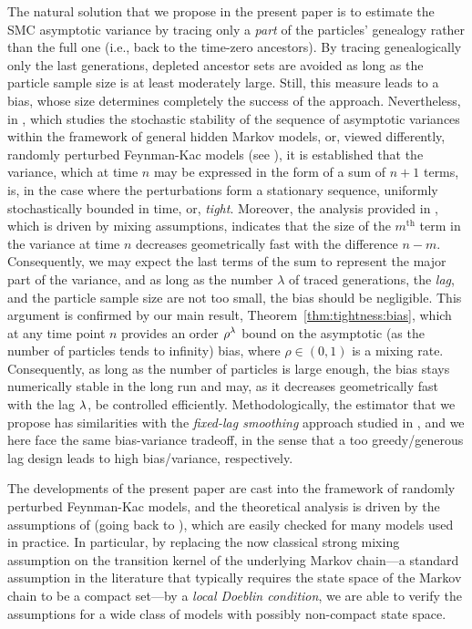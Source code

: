 The natural solution that we propose in the present paper is to estimate the SMC asymptotic variance by tracing only a \emph{part} of the particles' genealogy rather than the full one (i.e., back to the time-zero ancestors). By tracing genealogically only the last generations, depleted ancestor sets are avoided as long as the particle sample size is at least moderately large. Still, this measure leads to a bias, whose size determines completely the success of the approach. Nevertheless, in \cite{douc:moulines:olsson:2014}, which studies the stochastic stability of the sequence of asymptotic variances within the framework of general hidden Markov models, or, viewed differently, randomly perturbed Feynman-Kac models (see \cite[Remark~1]{douc:moulines:olsson:2014}), it is established that the variance, which at time $n$ may be expressed in the form of a sum of $n + 1$ terms, is, in the case where the perturbations form a stationary sequence, uniformly stochastically bounded in time, or, \emph{tight}. Moreover, the analysis provided in \cite{douc:moulines:olsson:2014}, which is driven by mixing assumptions, indicates that the size of the $m^{\mathrm{th}}$ term in the variance at time $n$ decreases geometrically fast with the difference $n - m$. Consequently, we may expect the last terms of the sum to represent the major part of the variance, and as long as the number $\lambda$ of traced generations, the \emph{lag}, and the particle sample size are not too small, the bias should be negligible. This argument is confirmed by our main result, Theorem~\ref{thm:tightness:bias}, which at any time point $n$ provides an order $\rho^\lambda$ bound on the asymptotic (as the number of particles tends to infinity) bias, where $\rho \in (0, 1)$ is a mixing rate. Consequently, as long as the number of particles is large enough, the bias stays numerically stable in the long run and may, as it decreases geometrically fast with the lag $\lambda$, be controlled efficiently. Methodologically, the estimator that we propose has similarities with the \emph{fixed-lag smoothing} approach studied in \cite{kitagawa:sato:2001,olsson:cappe:douc:moulines:2006,olsson:strojby:2010}, and we here face the same bias-variance tradeoff, in the sense that a too greedy/generous lag design leads to high bias/variance, respectively.  

The developments of the present paper are cast into the framework of randomly perturbed Feynman-Kac models, and the theoretical analysis is driven by the assumptions of \cite{douc:moulines:2012,douc:moulines:olsson:2014} (going back to \cite{douc:fort:moulines:priouret:2009}), which are easily checked for many models used in practice. In particular, by replacing the now classical strong mixing assumption on the transition kernel of the underlying Markov chain---a standard assumption in the literature that typically requires the state space of the Markov chain to be a compact set---by a \emph{local Doeblin condition}, we are able to verify the assumptions for a wide class of models with possibly non-compact state space. 

